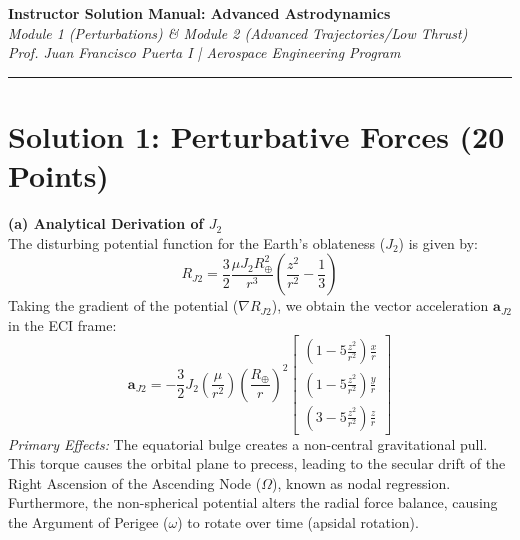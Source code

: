 \documentclass[11pt, letterpaper]{article}
\begin{document}
\begin{center}
    {\Large \textbf{Instructor Solution Manual: Advanced Astrodynamics}} \\
    \vspace{0.2cm}
    {\large \textit{Module 1 (Perturbations) \& Module 2 (Advanced Trajectories/Low Thrust)}} \\
    \vspace{0.4cm}
    \textit{Prof. Juan Francisco Puerta I | Aerospace Engineering Program}
\end{center}

\hrule
\vspace{0.5cm}

\section*{Solution 1: Perturbative Forces (20 Points)}

\textbf{(a) Analytical Derivation of $J_2$} \\
The disturbing potential function for the Earth's oblateness ($J_2$) is given by:
\begin{equation}
    R_{J2} = \frac{3}{2} \frac{\mu J_2 R_\oplus^2}{r^3} \left( \frac{z^2}{r^2} - \frac{1}{3} \right)
\end{equation}
Taking the gradient of the potential ($\nabla R_{J2}$), we obtain the vector acceleration $\boldsymbol{a}_{J2}$ in the ECI frame:
\begin{equation}
    \boldsymbol{a}_{J2} = -\frac{3}{2} J_2 \left(\frac{\mu}{r^2}\right) \left(\frac{R_\oplus}{r}\right)^2 
    \begin{bmatrix} 
        \left(1 - 5\frac{z^2}{r^2}\right)\frac{x}{r} \\ 
        \left(1 - 5\frac{z^2}{r^2}\right)\frac{y}{r} \\ 
        \left(3 - 5\frac{z^2}{r^2}\right)\frac{z}{r} 
    \end{bmatrix}
\end{equation}
\textit{Primary Effects:} The equatorial bulge creates a non-central gravitational pull. This torque causes the orbital plane to precess, leading to the secular drift of the Right Ascension of the Ascending Node ($\Omega$), known as nodal regression. Furthermore, the non-spherical potential alters the radial force balance, causing the Argument of Perigee ($\omega$) to rotate over time (apsidal rotation).
\end{document}
